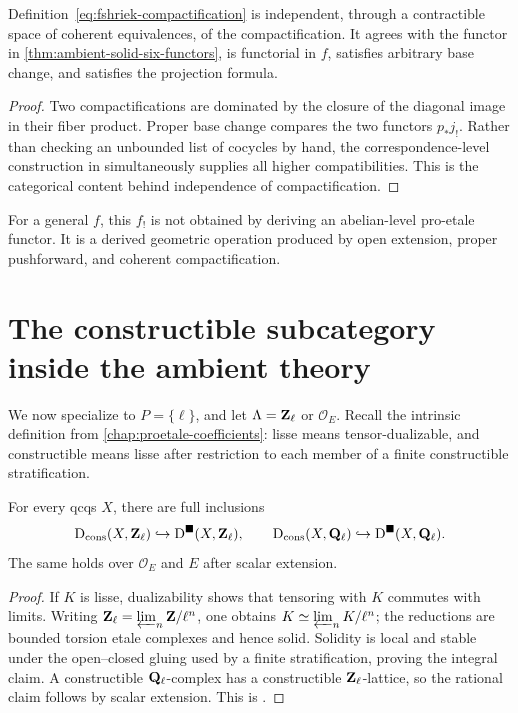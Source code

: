 \begin{theorem}
\label{thm:fshriek-independent}
Definition~\eqref{eq:fshriek-compactification} is independent, through a
contractible space of coherent equivalences, of the compactification.  It
agrees with the functor in
\cref{thm:ambient-solid-six-functors}, is functorial in \(f\), satisfies
arbitrary base change, and satisfies the projection formula.
\end{theorem}

\begin{proof}
Two compactifications are dominated by the closure of the diagonal image in
their fiber product.  Proper base change compares the two functors
\(p_*j_!\).  Rather than checking an unbounded list of cocycles by hand, the
correspondence-level construction in
\cite[Theorem~2.5.4]{RuimyTubachWolfSolid} simultaneously supplies all higher
compatibilities.  This is the categorical content behind independence of
compactification.
\end{proof}

\begin{warning}
For a general \(f\), this \(f_!\) is not obtained by deriving an abelian-level
pro-etale functor.  It is a derived geometric operation produced by open
extension, proper pushforward, and coherent compactification.
\end{warning}

\section{The constructible subcategory inside the ambient theory}

We now specialize to \(P=\{\ell\}\), and let
\(\Lambda=\mathbf Z_\ell\) or \(\mathcal O_E\).  Recall the intrinsic definition from
\cref{chap:proetale-coefficients}: lisse means tensor-dualizable, and
constructible means lisse after restriction to each member of a finite
constructible stratification.

\begin{theorem}
\label{thm:constructibles-embed-solid}
For every qcqs \(X\), there are full inclusions
\[
 \mathrm D_{\mathrm{cons}}(X,\mathbf Z_\ell)\hookrightarrow\mathrm D^{\blacksquare}(X,\mathbf Z_\ell),
 \qquad
 \mathrm D_{\mathrm{cons}}(X,\mathbf Q_\ell)\hookrightarrow\mathrm D^{\blacksquare}(X,\mathbf Q_\ell).
\]
The same holds over \(\mathcal O_E\) and \(E\) after scalar extension.
\end{theorem}

\begin{proof}
If \(K\) is lisse, dualizability shows that tensoring with \(K\) commutes
with limits.  Writing \(\mathbf Z_\ell=\varprojlim_n\mathbf Z/\ell^n\), one obtains
\(K\simeq\varprojlim_nK/\ell^n\); the reductions are bounded torsion etale
complexes and hence solid.  Solidity is local and stable under the
open--closed gluing used by a finite stratification, proving the integral
claim.  A constructible \(\mathbf Q_\ell\)-complex has a constructible \(\mathbf Z_\ell\)-lattice,
so the rational claim follows by scalar extension.  This is
\cite[Proposition~1.3.11 and Corollary~1.3.12]
{RuimyTubachWolfSolid}.
\end{proof}

